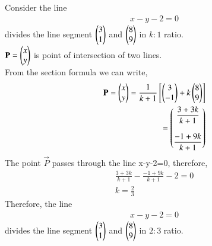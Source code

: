 \documentclass[journal,12pt,twocolumn]{IEEEtran}
\begin{document}
\begin{enumerate}
\solution Consider the line \begin{align} x-y-2=0 \end{align} divides the line segment $\begin{pmatrix}3 \\1\end{pmatrix}$ and $\begin{pmatrix}8\\9\end{pmatrix} $ in $k:1$ ratio.\\
$\mathbf{P}=\begin{pmatrix}x \\ y\end{pmatrix} $ is point of intersection of two lines.\\ 
From the section formula we can write,
\begin{align}
\mathbf{P} = \begin{pmatrix}x\\ y\end{pmatrix} = \displaystyle\frac{1}{k+1}\left[\begin{pmatrix}3\\-1\end{pmatrix}+ k\begin{pmatrix}8\\9\end{pmatrix}\right]\\
 = \begin{pmatrix}\displaystyle\frac{3+3k}{k+1} \\\\ \displaystyle\frac{-1+9k}{k+1}\end{pmatrix}
\end{align}
The point $\vec{P}$ passes through the line x-y-2=0, therefore,
\begin{align}
\displaystyle\frac{3+3k}{k+1} - \displaystyle\frac{-1+9k}{k+1} -2 = 0\\
k=\displaystyle\frac{2}{3}
\end{align}
Therefore, the line \begin{align} x-y-2=0 \end{align} divides the line segment $\begin{pmatrix}3 \\1\end{pmatrix}$ and $\begin{pmatrix}8\\9\end{pmatrix} $ in $2:3$ ratio.
\end{enumerate}
\end{document}
